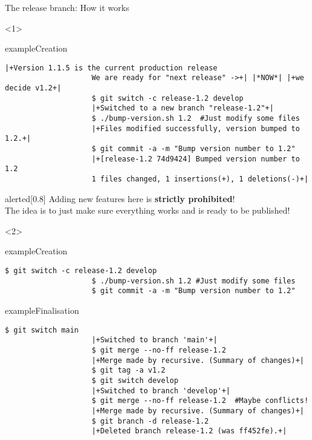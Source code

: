 \documentclass[usenames,svgnames,14pt]{beamer}
\begin{document}
\begin{frame}[fragile,c]{The release branch: How it works}
    \begin{overlayarea}{\textwidth}{0.9\textheight}
        \begin{onlyenv}<1>
            \begin{varblock}{example}{Creation}
                \begin{lstlisting}[style=MyBash]
                    |+Version 1.1.5 is the current production release
                    We are ready for "next release" ->+| |*NOW*| |+we decide v1.2+|
                    $ git switch -c release-1.2 develop
                    |+Switched to a new branch "release-1.2"+|
                    $ ./bump-version.sh 1.2  #Just modify some files
                    |+Files modified successfully, version bumped to 1.2.+|
                    $ git commit -a -m "Bump version number to 1.2"
                    |+[release-1.2 74d9424] Bumped version number to 1.2
                    1 files changed, 1 insertions(+), 1 deletions(-)+|
                \end{lstlisting}
            \end{varblock}
            \begin{varblock}{alerted}[0.8\textwidth]{}
                \alert{Adding new features here is \textbf{strictly prohibited}!}\\
                The idea is to just make sure everything works and is ready to be published!
            \end{varblock}
        \end{onlyenv}
        \begin{onlyenv}<2>
            \begin{varblock}{example}{Creation}
                \begin{lstlisting}[style=MyBash]
                    $ git switch -c release-1.2 develop
                    $ ./bump-version.sh 1.2 #Just modify some files
                    $ git commit -a -m "Bump version number to 1.2"
                \end{lstlisting}
            \end{varblock}
            \vspace{-2mm}
            \begin{varblock}{example}{Finalisation}
                \begin{lstlisting}[style=MyBash]
                    $ git switch main
                    |+Switched to branch 'main'+|
                    $ git merge --no-ff release-1.2
                    |+Merge made by recursive. (Summary of changes)+|
                    $ git tag -a v1.2
                    $ git switch develop
                    |+Switched to branch 'develop'+|
                    $ git merge --no-ff release-1.2  #Maybe conflicts!
                    |+Merge made by recursive. (Summary of changes)+|
                    $ git branch -d release-1.2
                    |+Deleted branch release-1.2 (was ff452fe).+|
                \end{lstlisting}
            \end{varblock}
        \end{onlyenv}
    \end{overlayarea}
\end{frame}
\end{document}
